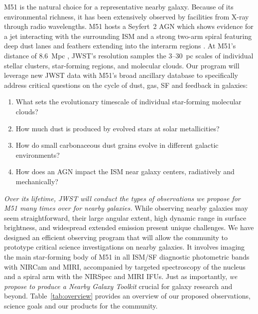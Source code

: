 \documentclass[12pt]{article}
\begin{document}
M51 is the natural choice for a representative nearby galaxy. Because of its environmental richness, it has been extensively observed by facilities from X-ray through radio wavelengths. M51 hosts a Seyfert~2 AGN \citep{ho1997} which shows evidence for a jet interacting with the surrounding ISM \citep{querejeta2016} and a strong two-arm spiral  featuring deep dust lanes and feathers extending into the interarm regions \citep{lavigne2006}. At M51's distance of 8.6~Mpc \citep{mcquinn2016}, JWST's resolution samples the 3--30~pc scales of individual stellar clusters, star-forming regions, and molecular clouds.  Our program will leverage new JWST data with M51's broad ancillary database to specifically address critical questions on the cycle of dust, gas, SF and feedback in galaxies: 
\begin{enumerate}
    \item What sets the evolutionary timescale of individual star-forming molecular clouds?\vspace{-0.1in}
    \item How much dust is produced by evolved stars at solar metallicities?\vspace{-0.1in}
    \item How do small carbonaceous dust grains evolve in different galactic environments?\vspace{-0.1in}
    \item How does an AGN impact the ISM near galaxy centers, radiatively and mechanically?\vspace{-0.1in}
\end{enumerate}

\vspace{0.05in}

{\em Over its lifetime, JWST will conduct the types of observations we propose for M51 many times over for nearby galaxies.}  While observing nearby galaxies may seem straightforward, their large angular extent, high dynamic range in surface brightness, and widespread extended emission present unique challenges. We have designed an efficient observing program that will allow the community to prototype critical science investigations on nearby galaxies.  It involves imaging the main star-forming body of M51 in all ISM/SF diagnostic photometric bands with NIRCam and MIRI, accompanied by targeted spectroscopy of the nucleus and a spiral arm with the NIRSpec and MIRI IFUs.  Just as importantly, {\em we propose to produce a Nearby Galaxy Toolkit} crucial for galaxy research and beyond. Table~\ref{tab:overview} provides an overview of our proposed observations, science goals and our products for the community. 
\end{document}
